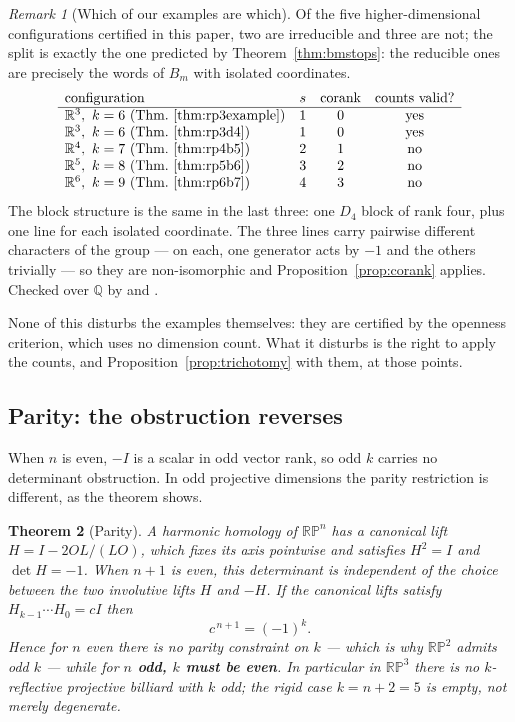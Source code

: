 \documentclass[11pt,a4paper]{article}
\theoremstyle{plain}
\newtheorem{theorem}{Theorem}[section]
\theoremstyle{definition}
\theoremstyle{remark}
\newtheorem{remark}[theorem]{Remark}
\begin{document}
\begin{remark}[Which of our examples are which]\label{rem:whichblocks}
Of the five higher-dimensional configurations certified in this paper, two are
irreducible and three are not; the split is exactly the one predicted by
Theorem~\ref{thm:bmstops}: the
reducible ones are precisely the words of $B_m$ with isolated coordinates.
\[
\begin{array}{lccc}
\text{configuration} & s & \text{corank} & \text{counts valid?}\\\hline
\mathbb{R}^3,\ k=6\text{ (Thm.~\ref{thm:rp3example})} & 1 & 0 & \text{yes}\\
\mathbb{R}^3,\ k=6\text{ (Thm.~\ref{thm:rp3d4})} & 1 & 0 & \text{yes}\\
\mathbb{R}^4,\ k=7\text{ (Thm.~\ref{thm:rp4b5})} & 2 & 1 & \text{no}\\
\mathbb{R}^5,\ k=8\text{ (Thm.~\ref{thm:rp5b6})} & 3 & 2 & \text{no}\\
\mathbb{R}^6,\ k=9\text{ (Thm.~\ref{thm:rp6b7})} & 4 & 3 & \text{no}
\end{array}
\]
The block structure is the same in the last three: one $D_4$ block of rank four, plus
one line for each isolated coordinate. The three lines carry pairwise different
characters of the group --- on each, one generator acts by $-1$ and the others
trivially --- so they are non-isomorphic and
Proposition~\ref{prop:corank} applies. Checked over $\mathbb{Q}$ by
 and .

None of this disturbs the examples themselves: they are certified by the openness
criterion, which uses no dimension count. What it disturbs is the right to apply the
counts, and Proposition~\ref{prop:trichotomy} with them, at those points.
\end{remark}

\subsection{Parity: the obstruction reverses}

When $n$ is even, $-I$ is a scalar in odd vector rank, so odd $k$ carries no
determinant obstruction. In odd projective dimensions the parity restriction is
different, as the theorem shows.

\begin{theorem}[Parity]\label{thm:parity}
A harmonic homology of $\mathbb{RP}^n$ has a canonical lift
$H=I-2OL/(LO)$, which fixes its axis pointwise and satisfies $H^2=I$ and
$\det H=-1$. When $n+1$ is even, this determinant is independent of the
choice between the two involutive lifts $H$ and $-H$. If the canonical lifts satisfy
$H_{k-1}\cdots H_0=cI$ then
\[
  c^{\,n+1}=(-1)^k .
\]
Hence for $n$ even there is no parity constraint on $k$ --- which is why $\mathbb{RP}^2$ admits
odd $k$ --- while for \textbf{$n$ odd, $k$ must be even}. In particular in
$\mathbb{RP}^3$ there is no $k$-reflective projective billiard with $k$ odd; the
rigid case $k=n+2=5$ is \emph{empty}, not merely degenerate.
\end{theorem}
\end{document}
